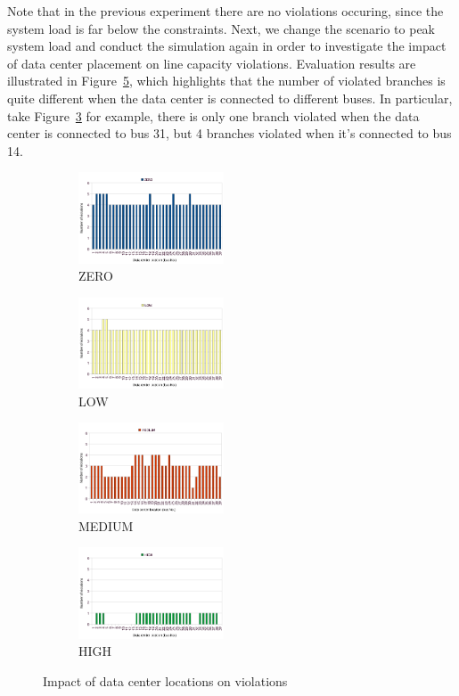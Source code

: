 Note that in the previous experiment there are no violations occuring, since the system load is far below the constraints. Next, we change the scenario to peak system load and conduct the simulation again in order to investigate the impact of data center placement on line capacity violations. Evaluation results are illustrated in Figure~\ref{fig:loc-vio}, which highlights that the number of violated branches is quite different when the data center is connected to different buses. In particular, take Figure~\ref{fig:c:l-v-mid} for example, there is only one branch violated when the data center is connected to bus 31, but 4 branches violated when it's connected to bus 14. 


\begin{figure} [ht]
\begin{subfigure}[b]{.22\textwidth}
  \includegraphics[width=4.3cm]{img/loc-vio-zero}
  \caption{ZERO}
  \label{fig:a:l-v-zero}
\end{subfigure}
\hfill
\begin{subfigure}[b]{.22\textwidth}
  \includegraphics[width=4.3cm]{img/loc-vio-low}
  \caption{LOW}
   \label{fig:b:l-v-low}
\end{subfigure}
\begin{subfigure}[b]{.22\textwidth}
  \includegraphics[width=4.3cm]{img/loc-vio-mid}
  \caption{MEDIUM}
   \label{fig:c:l-v-mid}
\end{subfigure}
\hfill
\begin{subfigure}[b]{.22\textwidth}
  \includegraphics[width=4.3cm]{img/loc-vio-high}
  \caption{HIGH}
   \label{fig:d:l-v-high}
\end{subfigure}
\caption{Impact of data center locations on violations}
\label{fig:loc-vio}
\end{figure}


